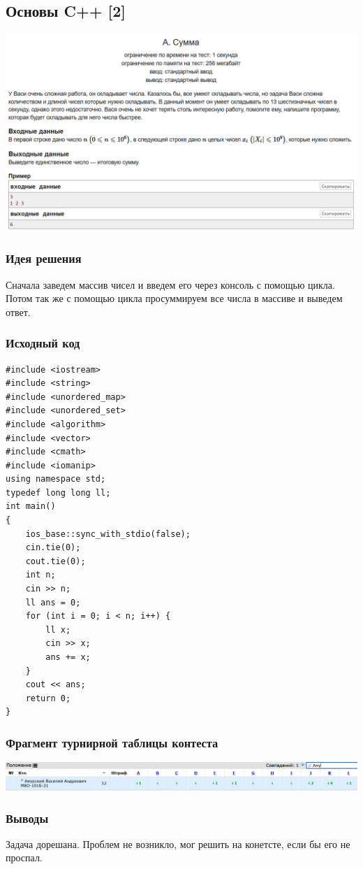 \subsection*{Основы C++ [2]}
\begin{center}
\includegraphics[width=\textwidth]{2A.png}
\end{center}
\subsubsection*{Идея решения}
Сначала заведем массив чисел и введем его через консоль с помощью цикла. Потом так же с помощью цикла просуммируем все числа в массиве и выведем ответ.
\subsubsection*{Исходный код}
\begin{lstlisting}
#include <iostream>
#include <string>
#include <unordered_map>
#include <unordered_set>
#include <algorithm>
#include <vector>
#include <cmath>
#include <iomanip>
using namespace std;
typedef long long ll;
int main()
{
	ios_base::sync_with_stdio(false);
	cin.tie(0);
	cout.tie(0);
	int n;
	cin >> n;
	ll ans = 0;
	for (int i = 0; i < n; i++) {
		ll x;
		cin >> x;
		ans += x;
	}
	cout << ans;
	return 0;
}
\end{lstlisting}
\subsubsection*{Фрагмент турнирной таблицы контеста}
\begin{center}
\includegraphics[width=\textwidth]{state2.png}\newline\noindent
\end{center}

\subsubsection*{Выводы}
Задача дорешана. Проблем не возникло, мог решить на конетсте, если бы его не проспал.
